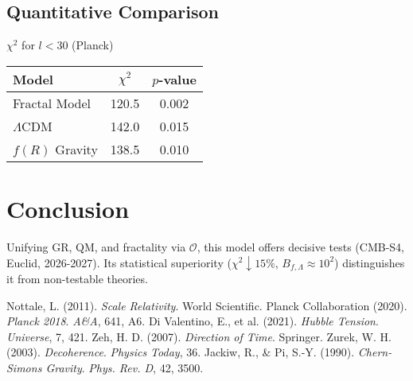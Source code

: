 \documentclass[aps,prl,twocolumn,groupedaddress]{revtex4-2}
\newcommand{\Opp}{\mathcal{O}}
\begin{document}
\vspace{10pt} %
\subsection{Quantitative Comparison}

\centering %
\(\chi^2\) for \(l < 30\) (Planck) \\
\vspace{5pt} %
\begin{tabular}{lcc}
\toprule
\textbf{Model} & \textbf{\(\chi^2\)} & \textbf{\(p\)-value} \\
\midrule
Fractal Model & 120.5 & 0.002 \\
\(\Lambda\)CDM & 142.0 & 0.015 \\
\(f(R)\) Gravity & 138.5 & 0.010 \\
\bottomrule
\end{tabular}
\label{tab:chi2}

\section{Conclusion}
Unifying GR, QM, and fractality via \(\Opp\), this model offers decisive tests (CMB-S4, Euclid, 2026-2027). Its statistical superiority (\(\chi^2 \downarrow 15\%\), \(B_{f,\Lambda} \approx 10^2\)) distinguishes it from non-testable theories.

\begin{thebibliography}{9}
 Nottale, L. (2011). \textit{Scale Relativity}. World Scientific.
 Planck Collaboration (2020). \textit{Planck 2018}. \textit{A\&A}, 641, A6.
 Di Valentino, E., et al. (2021). \textit{Hubble Tension}. \textit{Universe}, 7, 421.
 Zeh, H. D. (2007). \textit{Direction of Time}. Springer.
 Zurek, W. H. (2003). \textit{Decoherence}. \textit{Physics Today}, 36.
 Jackiw, R., & Pi, S.-Y. (1990). \textit{Chern-Simons Gravity}. \textit{Phys. Rev. D}, 42, 3500.
\end{thebibliography}
\end{document}
